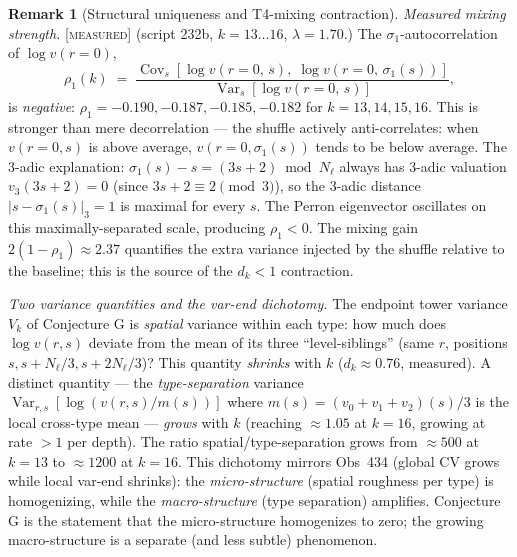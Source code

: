 \documentclass[11pt]{article}
\theoremstyle{definition}
\newtheorem{remark}[theorem]{Remark}
\newcommand{\MEASURED}{\textup{[\textsc{measured}]}}
\begin{document}
\begin{remark}[Structural uniqueness and T4-mixing contraction]
\noindent\emph{Measured mixing strength.} \MEASURED{} (script 232b,
$k = 13\ldots 16$, $\lambda = 1.70$.) The $\sigma_1$-autocorrelation
of $\log v(r{=}0)$,
\[
  \rho_1(k) \;=\;
  \frac{\operatorname{Cov}_s[\log v(r{=}0,\,s),\;\log v(r{=}0,\,\sigma_1(s))]}
       {\operatorname{Var}_s[\log v(r{=}0,\,s)]},
\]
is \emph{negative}: $\rho_1 = -0.190, -0.187, -0.185, -0.182$
for $k = 13, 14, 15, 16$.
This is stronger than mere decorrelation --- the shuffle actively
anti-correlates: when $v(r{=}0,s)$ is above average, $v(r{=}0,\sigma_1(s))$
tends to be below average.
The 3-adic explanation: $\sigma_1(s) - s = (3s+2) \bmod N_\ell$ always
has $3$-adic valuation $v_3(3s+2) = 0$ (since $3s+2 \equiv 2 \pmod 3$), so
the 3-adic distance $|s - \sigma_1(s)|_3 = 1$ is maximal for every $s$.
The Perron eigenvector oscillates on this maximally-separated scale,
producing $\rho_1 < 0$.
The mixing gain $2(1-\rho_1) \approx 2.37$ quantifies the extra variance
injected by the shuffle relative to the baseline; this is the
source of the $d_k < 1$ contraction.

\noindent\emph{Two variance quantities and the var-end dichotomy.}
The endpoint tower variance $V_k$ of Conjecture G is \emph{spatial} variance
within each type: how much does $\log v(r,s)$ deviate from the mean of
its three ``level-siblings'' (same $r$, positions $s, s+N_\ell/3, s+2N_\ell/3$)?
This quantity \emph{shrinks} with $k$ ($d_k \approx 0.76$, measured).
A distinct quantity --- the \emph{type-separation} variance
$\operatorname{Var}_{r,s}[\log(v(r,s)/m(s))]$ where $m(s)=(v_0+v_1+v_2)(s)/3$
is the local cross-type mean --- \emph{grows} with $k$ (reaching $\approx 1.05$
at $k=16$, growing at rate $> 1$ per depth).
The ratio spatial/type-separation grows from $\approx 500$ at $k=13$
to $\approx 1200$ at $k=16$.
This dichotomy mirrors Obs~434 (global CV grows while local var-end shrinks):
the \emph{micro-structure} (spatial roughness per type) is homogenizing, while
the \emph{macro-structure} (type separation) amplifies.
Conjecture G is the statement that the micro-structure homogenizes to zero;
the growing macro-structure is a separate (and less subtle) phenomenon.
\end{remark}
\end{document}
